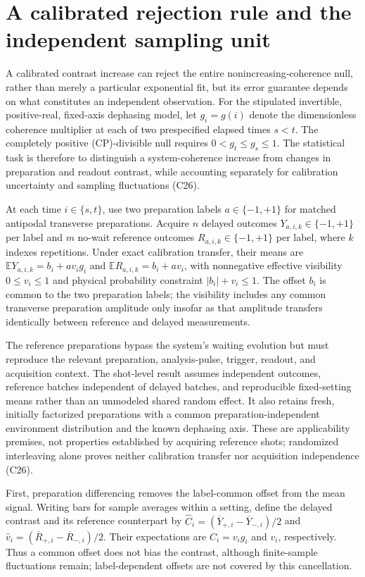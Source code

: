 \documentclass[11pt]{article}
\begin{document}
\section{A calibrated rejection rule and the independent sampling unit}
A calibrated contrast increase can reject the entire nonincreasing-coherence null, rather than merely a particular exponential fit, but its error guarantee depends on what constitutes an independent observation. For the stipulated invertible, positive-real, fixed-axis dephasing model, let $g_i=g(i)$ denote the dimensionless coherence multiplier at each of two prespecified elapsed times $s<t$. The completely positive (CP)-divisible null requires $0<g_t\leq g_s\leq1$. The statistical task is therefore to distinguish a system-coherence increase from changes in preparation and readout contrast, while accounting separately for calibration uncertainty and sampling fluctuations (C26).

At each time $i\in\{s,t\}$, use two preparation labels $a\in\{-1,+1\}$ for matched antipodal transverse preparations. Acquire $n$ delayed outcomes $Y_{a,i,k}\in\{-1,+1\}$ per label and $m$ no-wait reference outcomes $R_{a,i,k}\in\{-1,+1\}$ per label, where $k$ indexes repetitions. Under exact calibration transfer, their means are $\mathbb E Y_{a,i,k}=b_i+a v_i g_i$ and $\mathbb E R_{a,i,k}=b_i+a v_i$, with nonnegative effective visibility $0\leq v_i\leq1$ and physical probability constraint $|b_i|+v_i\leq1$. The offset $b_i$ is common to the two preparation labels; the visibility includes any common transverse preparation amplitude only insofar as that amplitude transfers identically between reference and delayed measurements.

The reference preparations bypass the system\textquoteright{}s waiting evolution but must reproduce the relevant preparation, analysis-pulse, trigger, readout, and acquisition context. The shot-level result assumes independent outcomes, reference batches independent of delayed batches, and reproducible fixed-setting means rather than an unmodeled shared random effect. It also retains fresh, initially factorized preparations with a common preparation-independent environment distribution and the known dephasing axis. These are applicability premises, not properties established by acquiring reference shots; randomized interleaving alone proves neither calibration transfer nor acquisition independence (C26).

First, preparation differencing removes the label-common offset from the mean signal. Writing bars for sample averages within a setting, define the delayed contrast and its reference counterpart by $\widehat C_i=(\overline Y_{+,i}-\overline Y_{-,i})/2$ and $\widehat v_i=(\overline R_{+,i}-\overline R_{-,i})/2$. Their expectations are $C_i=v_i g_i$ and $v_i$, respectively. Thus a common offset does not bias the contrast, although finite-sample fluctuations remain; label-dependent offsets are not covered by this cancellation.
\end{document}
